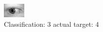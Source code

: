 \begin{figure}[h!]
\begin{center}
\includegraphics[width=0.60\columnwidth]{figures/ID764_class_3_target_4.png}
\end{center}
\caption{ Classification: 3 actual target: 4}
\label{fig:ID764_class_3_target_4}
\end{figure}
